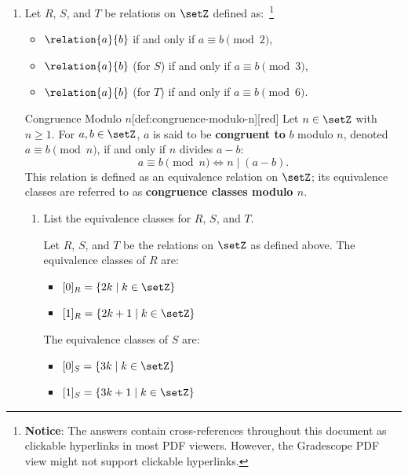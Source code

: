 \begin{enumerate}
\begin{enumerate}
\begin{subprove}
    \end{subprove}
    \item $[a]_n \cap [b]_n \neq \emptyset \IFF a \equiv b \pmod{n}$
    \item $[a]_n \subseteq [b]_n \IFF a \equiv b \pmod{n}$
  \end{enumerate}


  \newpage
  \item Let $R$, $S$, and $T$ be relations on $\setZ$ defined as:~\footnote{
    \textbf{Notice}: The answers contain cross-references throughout this document as clickable hyperlinks in most PDF viewers. 
    However, the Gradescope PDF view might not support clickable hyperlinks.
  }
  \begin{itemize}
    \item $\relation{a}{b}$ if and only if $a \equiv b \pmod{2}$,
    \item $\relation{a}{b}$ (for $S$) if and only if $a \equiv b \pmod{3}$,
    \item $\relation{a}{b}$ (for $T$) if and only if $a \equiv b \pmod{6}$.
  \end{itemize}
  \begin{define}{Congruence Modulo $n$}[def:congruence-modulo-n][red]
    Let $n \in \setZ$ with $n \geq 1$. For $a, b \in \setZ$, $a$ is said to be \textbf{congruent to} $b$ modulo $n$, denoted $a \equiv b \pmod{n}$, if and only if $n$ divides $a-b$:
    \[
      a \equiv b \pmod{n} \iff n \mid (a-b).
    \]
    This relation is defined as an equivalence relation on $\setZ$; its equivalence classes are referred to as \textbf{congruence classes modulo $n$}.
  \end{define} 
  \begin{enumerate}
    \item List the equivalence classes for $R$, $S$, and $T$.
      \begin{subanswer}
        Let $R$, $S$, and $T$ be the relations on $\setZ$ as defined above. The equivalence classes of $R$ are:
        \begin{itemize}
          \item $[0]_R = \{2k \mid k \in \setZ\}$
          \item $[1]_R = \{2k+1 \mid k \in \setZ\}$
        \end{itemize}
        The equivalence classes of $S$ are:
        \begin{itemize}
          \item $[0]_S = \{3k \mid k \in \setZ\}$
          \item $[1]_S = \{3k+1 \mid k \in \setZ\}$

\end{itemize}
\end{subanswer}
\end{enumerate}
\end{enumerate}
